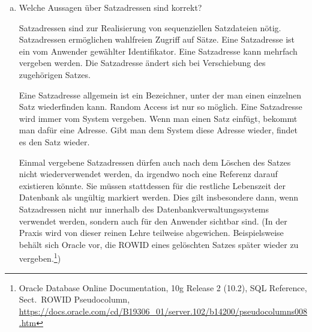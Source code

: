 \begin{enumerate}[a)]
	\item Welche Aussagen über Satzadressen sind korrekt?

    \begin{itemize}\setlength\itemsep{-0.2em}
        \itemmc   Satzadressen sind zur Realisierung von sequenziellen Satzdateien nötig.
        \itemmcsol Satzadressen ermöglichen wahlfreien Zugriff auf Sätze.
        \itemmc   Eine Satzadresse ist ein vom Anwender gewählter Identifikator.
        \itemmc   Eine Satzadresse kann mehrfach vergeben werden.
        \itemmc   Die Satzadresse ändert sich bei Verschiebung des zugehörigen Satzes.
    \end{itemize}

	\begin{solution}
	Eine Satzadresse allgemein ist ein Bezeichner, unter der man einen einzelnen Satz wiederfinden kann. Random Access ist nur so möglich. Eine Satzadresse wird immer vom System vergeben. Wenn man einen Satz einfügt, bekommt man dafür eine Adresse. Gibt man dem System diese Adresse wieder, findet es den Satz wieder.

	Einmal vergebene Satzadressen dürfen auch nach dem Löschen des Satzes nicht wiederverwendet werden, da irgendwo noch eine Referenz darauf existieren könnte. Sie müssen stattdessen für die restliche Lebenszeit der Datenbank als ungültig markiert werden. Dies gilt insbesondere dann, wenn Satzadressen nicht nur innerhalb des Datenbankverwaltungssystems verwendet werden, sondern auch für den Anwender sichtbar sind. (In der Praxis wird von dieser reinen Lehre teilweise abgewichen. Beispielsweise behält sich Oracle vor, die ROWID eines gelöschten Satzes später wieder zu vergeben.\footnote{Oracle Database Online Documentation, 10g Release 2 (10.2), SQL Reference, Sect.\ ROWID Pseudocolumn, \url{https://docs.oracle.com/cd/B19306_01/server.102/b14200/pseudocolumns008.htm}})
	\end{solution}
\end{enumerate}



